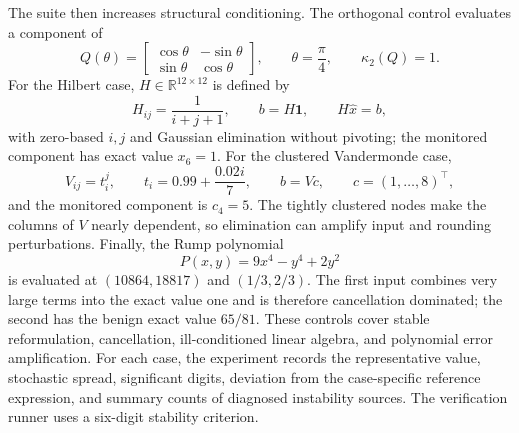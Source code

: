\documentclass[manuscript, screen]{acmart}
\begin{document}
The suite then increases structural conditioning. The orthogonal control evaluates a component of
\begin{equation}
Q(\theta)
=
\begin{bmatrix}
\cos\theta & -\sin\theta\\
\sin\theta & \cos\theta
\end{bmatrix},
\qquad
\theta=\frac{\pi}{4},
\qquad
\kappa_2(Q)=1.
\label{eq:control-orthogonal}
\end{equation}
For the Hilbert case, $H\in\mathbb{R}^{12\times12}$ is defined by
\begin{equation}
H_{ij}=\frac{1}{i+j+1},
\qquad
b=H\mathbf{1},
\qquad
H\widehat{x}=b,
\label{eq:control-hilbert}
\end{equation}
with zero-based $i,j$ and Gaussian elimination without pivoting; the monitored component has exact value $x_6=1$. For the clustered Vandermonde case,
\begin{equation}
V_{ij}=t_i^j,
\qquad
t_i=0.99+\frac{0.02i}{7},
\qquad
b=Vc,
\qquad
c=(1,\ldots,8)^\top,
\label{eq:control-vandermonde}
\end{equation}
and the monitored component is $c_4=5$. The tightly clustered nodes make the columns of $V$ nearly dependent, so elimination can amplify input and rounding perturbations. Finally, the Rump polynomial
\begin{equation}
P(x,y)=9x^4-y^4+2y^2
\label{eq:control-rump}
\end{equation}
is evaluated at $(10864,18817)$ and $(1/3,2/3)$. The first input combines very large terms into the exact value one and is therefore cancellation dominated; the second has the benign exact value $65/81$. These controls cover stable reformulation, cancellation, ill-conditioned linear algebra, and polynomial error amplification. For each case, the experiment records the representative value, stochastic spread, significant digits, deviation from the case-specific reference expression, and summary counts of diagnosed instability sources. The verification runner uses a six-digit stability criterion.
\end{document}
